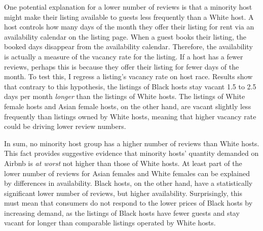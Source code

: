 One potential explanation for a lower number of reviews is that a minority host might make their listing available to guests less frequently than a White host. A host controls how many days of the month they offer their listing for rent via an availability calendar on the listing page. When a guest books their listing, the booked days disappear from the availability calendar. Therefore, the availability is actually a measure of the vacancy rate for the listing. If a host has a fewer reviews, perhaps this is because they offer their listing for fewer days of the month. To test this, I regress a listing's vacancy rate on host race. Results show that contrary to this hypothesis, the listings of Black hosts stay vacant 1.5 to 2.5 days per month \textit{longer} than the listings of White hosts. The listings of White female hosts and Asian female hosts, on the other hand, are vacant slightly less frequently than listings owned by White hosts, meaning that higher vacancy rate could be driving lower review numbers.

In sum, no minority host group has a higher number of reviews than White hosts. This fact provides suggestive evidence that minority hosts' quantity demanded on Airbnb is \textit{at worst} not higher than those of White hosts. At least part of the lower number of reviews for Asian females and White females can be explained by differences in availability. Black hosts, on the other hand, have a statistically significant lower number of reviews, but higher availability. Surprisingly, this must mean that consumers do not respond to the lower prices of Black hosts by increasing demand, as the listings of Black hosts have fewer guests and stay vacant for longer than comparable listings operated by White hosts. 


